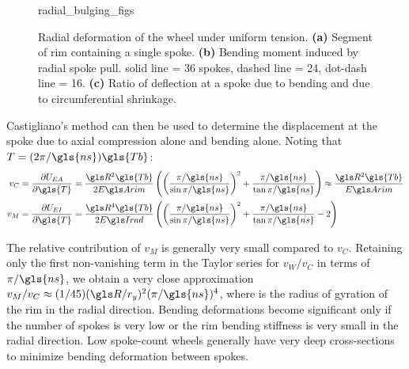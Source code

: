 \documentclass[\rootdir/thesis.tex]{subfiles}
\begin{document}
\begin{figure}
\centering
{radial_bulging_figs}
\caption{Radial deformation of the wheel under uniform tension. \textbf{(a)} Segment of rim containing a single spoke. \textbf{(b)} Bending moment induced by radial spoke pull. solid line = 36 spokes, dashed line = 24, dot-dash line = 16. \textbf{(c)} Ratio of deflection at a spoke due to bending and due to circumferential shrinkage.}
\label{fig:radial_bulging}
\end{figure}

Castigliano's method can then be used to determine the displacement at the spoke due to axial compression alone and bending alone. Noting that $T = (2\pi/\gls{ns})\gls{Tb}$:
\begin{align}
v_C &= \frac{\partial U_{EA}}{\partial \gls{T}} = \frac{\R^2\gls{Tb}}{2\EA} \left( \left(\frac{\pi/\gls{ns}}{\sin{\pi/\gls{ns}}}\right)^2 +
    \frac{\pi/\gls{ns}}{\tan{\pi/\gls{ns}}}\right)
    \approx \frac{\R^2\gls{Tb}}{\EA}\label{eq:vC}\\
v_M &= \frac{\partial U_{EI}}{\partial \gls{T}} = \frac{\R^4\gls{Tb}}{2\EIr} \left( \left(\frac{\pi/\gls{ns}}{\sin{\pi/\gls{ns}}}\right)^2 +
    \frac{\pi/\gls{ns}}{\tan{\pi/\gls{ns}}} - 2\right)\label{eq:vM}
\end{align}

The relative contribution of $v_M$ is generally very small compared to $v_C$. Retaining only the first non-vanishing term in the Taylor series for $v_W/v_C$ in terms of $\pi/\gls{ns}$, we obtain a very close approximation $v_M/v_C\approx(1/45)(\R/\ry)^2(\pi/\gls{ns})^4$, where \ry is the radius of gyration of the rim in the radial direction. Bending deformations become significant only if the number of spokes is very low or the rim bending stiffness is very small in the radial direction. Low spoke-count wheels generally have very deep cross-sections to minimize bending deformation between spokes.
\end{document}

